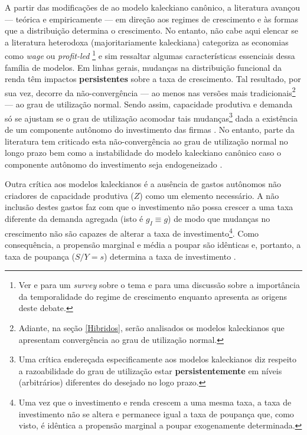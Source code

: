 A partir das modificações de \textcite{bhaduri_unemployment_1990} ao modelo kaleckiano canônico, a literatura avançou --- teórica e empiricamente --- em direção aos regimes de crescimento e às formas que a distribuição determina o crescimento.
No entanto, não  cabe aqui elencar se a  literatura heterodoxa (majoritariamente kaleckiana)  categoriza as economias como \textit{wage} ou \textit{profit-led}
\footnote{Ver 
	\textcite{setterfield_distribution_2002} 
	e \textcite{onaran_is_2013} para um  \textit{survey} sobre o tema e \textcite{blecker_wage_led_2016} para uma discussão sobre a importância da temporalidade do regime de crescimento enquanto \textcite{lavoie_origins_2017} apresenta as origens deste debate.} 
e sim ressaltar algumas  características essenciais dessa família de modelos. Em linhas gerais, mudanças na distribuição funcional da renda têm impactos \textbf{persistentes} sobre a taxa de crescimento. 
Tal resultado, por sua vez, decorre da não-convergência --- ao menos nas versões mais tradicionais\footnote{
	Adiante, na seção \ref{Hibridos}, serão analisados os modelos kaleckianos que apresentam convergência ao grau de utilização normal.
} --- ao grau de utilização normal. Sendo assim, capacidade produtiva e demanda só se ajustam se o grau de utilização acomodar tais mudanças\footnote{Uma crítica endereçada especificamente aos modelos kaleckianos diz respeito a razoabilidade do grau de utilização estar \textbf{persistentemente} em níveis (arbitrários) diferentes do desejado no logo prazo.} dada a existência de um componente autônomo do investimento das firmas \cite[p.~84--86]{serrano_sraffian_2017}.
No entanto, parte da literatura tem criticado esta não-convergência ao grau de utilização normal no longo prazo \cites{skott_finance_1988}{skott_theoretical_2012}
bem como a instabilidade do modelo kaleckiano canônico caso o componente autônomo do investimento seja endogeneizado \cites{hein_harrodian_2012}{allain_tackling_2015}{nah_long-run_2017}.

Outra crítica aos modelos kaleckianos é a ausência de gastos autônomos não criadores de capacidade produtiva ($Z$) como um elemento necessário.
A não inclusão destes gastos faz com que o investimento não possa crescer a uma taxa diferente da demanda agregada (isto é $g_I \equiv g$) de modo que mudanças no crescimento não são capazes de alterar a taxa de investimento\footnote{Uma vez que o investimento e renda crescem a uma mesma taxa, a taxa de investimento não se altera e permanece igual a taxa de poupança que, como visto, é idêntica a propensão marginal a poupar exogenamente determinada.}. 
Como consequência, a propensão marginal e média a poupar são idênticas e, portanto, a taxa de poupança ($S/Y = s$) determina a taxa de investimento \cite[p.~5--7]{fagundes_role_2017}.

